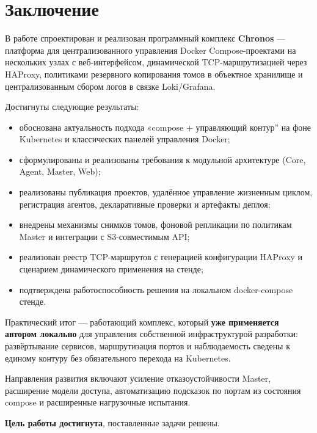 \section{Заключение}

В работе спроектирован и реализован программный комплекс \textbf{Chronos} --- платформа для централизованного управления Docker Compose-проектами на нескольких узлах с веб-интерфейсом, динамической TCP-маршрутизацией через HAProxy, политиками резервного копирования томов в объектное хранилище и централизованным сбором логов в связке Loki/Grafana.

Достигнуты следующие результаты:
\begin{itemize}[leftmargin=1.5cm]
  \item обоснована актуальность подхода «compose + управляющий контур'' на фоне Kubernetes и классических панелей управления Docker;
  \item сформулированы и реализованы требования к модульной архитектуре (Core, Agent, Master, Web);
  \item реализованы публикация проектов, удалённое управление жизненным циклом, регистрация агентов, декларативные проверки и артефакты деплоя;
  \item внедрены механизмы снимков томов, фоновой репликации по политикам Master и интеграции с S3-совместимым API;
  \item реализован реестр TCP-маршрутов с генерацией конфигурации HAProxy и сценарием динамического применения на стенде;
  \item подтверждена работоспособность решения на локальном docker-compose стенде.
\end{itemize}

Практический итог --- работающий комплекс, который \textbf{уже применяется автором локально} для управления собственной инфраструктурой разработки: развёртывание сервисов, маршрутизация портов и наблюдаемость сведены к единому контуру без обязательного перехода на Kubernetes.

Направления развития включают усиление отказоустойчивости Master, расширение модели доступа, автоматизацию подсказок по портам из состояния compose и расширенные нагрузочные испытания.

\textbf{Цель работы достигнута}, поставленные задачи решены.
